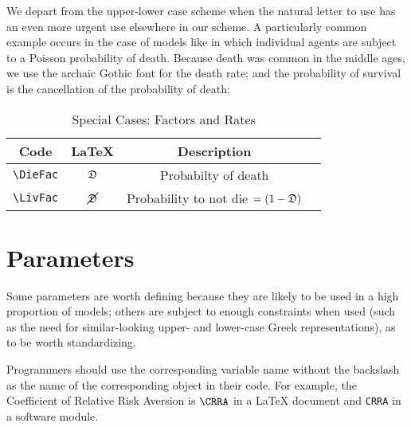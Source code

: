 \documentclass[12pt]{econtex}
\begin{document}
We depart from the upper-lower case scheme when the natural letter to use has an even more urgent use elsewhere in our scheme.
A particularly common example occurs in the case of models like \cite{blanchardFinite} in which 
individual agents are subject to a Poisson probability of death.  Because death was common in the 
middle ages, we use the archaic Gothic font for the death rate; and the probability of survival is the cancellation of the probability of death:
\begin{table}[h]
	\centering
	\begin{tabular}{|>{\ttfamily}cccl|} 		
		\hline
		 Code & \LaTeX & Description &  \\ 
		\hline
   \verb|\DieFac|     & $\mathfrak{D}$     & Probabilty of death & 
\\ \verb|\LivFac|     & $\cancel{\mathfrak{D}}$     & Probability to not die $=(1-\mathfrak{D})$ & 
\\	\hline
	\end{tabular}
	\caption{Special Cases: Factors and Rates}
	\label{table:SpecialFactors}
\end{table}	

\section{Parameters}
  Some parameters are worth defining because they are likely to be
  used in a high proportion of models; others are subject to enough
  constraints when used (such as the need for similar-looking upper-
  and lower-case Greek representations), as to be worth standardizing.

Programmers should 
use the corresponding variable name without the backslash as the name of the corresponding object 
in their code.  For example, the Coefficient of Relative Risk Aversion is $\verb|\CRRA|$ in a \LaTeX 
document and \texttt{CRRA} in a software module.
\end{document}
